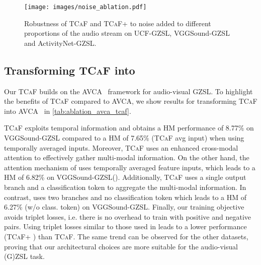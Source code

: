 \documentclass[runningheads]{llncs}
\newcommand{\modelName}{\textsc{TCaF}\xspace}
\newcommand{\activity}{{ActivityNet-GZSL}\xspace}
\newcommand{\ucf}{{UCF-GZSL}\xspace}
\newcommand{\vgg}{{VGGSound-GZSL}\xspace}
\begin{document}
\begin{figure}{}{}
  \begin{center}
     \texttt{[image: images/noise\_ablation.pdf]}
  \end{center}
  \caption{Robustness of \modelName and \modelName+ to noise added to different proportions of the audio stream on \ucf, \vgg and \activity.}\label{fig:supp_audiowithnoise_ucf}
\end{figure}




\subsection{Transforming \modelName into \cite{mercea2022}}
\label{section:tcaf_to_avca}
Our \modelName builds on the AVCA~\cite{mercea2022} framework for audio-visual GZSL. To highlight the benefits of \modelName compared to AVCA, we show results for transforming \modelName into AVCA~\cite{mercea2022} in \cref{tab:ablation_avca_tcaf}. 

\modelName exploits temporal information and obtains a HM performance of 8.77\% on \vgg compared to a HM of 7.65\% (\modelName avg input) when using temporally averaged inputs. Moreover, \modelName uses an enhanced cross-modal attention to effectively gather multi-modal information. On the other hand, the attention mechanism of \cite{mercea2022} uses temporally averaged feature inputs, which leads to a HM of 6.82\% on \vgg (\cite{mercea2022}). Additionally, \modelName uses a single output branch and a classification token to aggregate the multi-modal information. In contrast, \cite{mercea2022} uses two branches and no classification token which leads to a HM of 6.27\% (w/o class. token) on \vgg. Finally, our training objective avoids triplet losses, i.e. there is no overhead to train with positive and negative pairs. Using triplet losses similar to those used in \cite{mercea2022} leads to a lower performance (\modelName + ) than \modelName.
The same trend can be observed for the other datasets, proving that our architectural choices are more suitable for the audio-visual (G)ZSL task.
\end{document}
